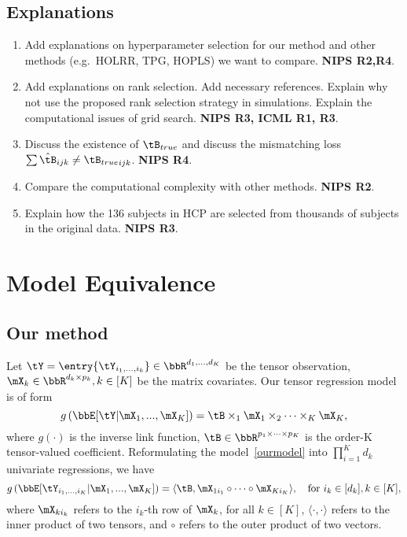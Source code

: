\documentclass[11pt]{article}
\newcommand{\of}[1]{\left(#1\right)}
\theoremstyle{plain}
\theoremstyle{definition}
\begin{document}
\subsection{Explanations}
\begin{enumerate}
	\item Add explanations on hyperparameter selection for our method and other methods (e.g.\ HOLRR, TPG, HOPLS) we want to compare. {\bf NIPS R2,R4}.
	\item Add explanations on rank selection. Add necessary references. Explain why not use the proposed rank selection strategy in simulations. Explain the computational issues of grid search. {\bf NIPS R3, ICML R1, R3}.
	\item Discuss the existence of $\tB_{true}$ and discuss the mismatching loss $\sum \hat \tB_{ijk} \neq {\tB_{true}}_{ijk}$. {\bf NIPS R4}.
	\item Compare the computational complexity with other methods. {\bf NIPS R2}.
	\item Explain how the 136 subjects in HCP are selected from thousands of subjects in the original data. {\bf NIPS R3}.
\end{enumerate}


\section{Model Equivalence}

\subsection{Our method}
Let $\tY = \entry{\tY_{i_1,...,i_k}} \in \bbR^{d_1,...,d_K}$ be the tensor observation, $\mX_k \in \bbR^{d_k \times p_k}, k \in [K]$ be the matrix covariates. Our tensor regression model is of form
\begin{equation}\label{ourmodel}
	g \of{ \bbE[\tY |\mX_1 ,...,\mX_K ] } = \tB \times_1 \mX_1 \times_2 \cdots \times_K \mX_K,
\end{equation}
where $g(\cdot)$ is the inverse link function, $\tB \in \bbR^{p_1 \times \cdots \times p_K}$ is the order-K tensor-valued coefficient. Reformulating the model~\eqref{ourmodel} into $\prod_{i=1}^K d_k$ univariate regressions, we have
\begin{equation}\label{ourmodel1}
	g \of{ \bbE[\tY_{i_1,...,i_K} |\mX_1 ,...,\mX_K ] }  = \langle \tB, \mX_{1i_1} \circ \cdots \circ \mX_{K i_K}  \rangle, \quad \text{for } i_k \in [d_k], k\in[K],
\end{equation}
where $\mX_{k i_k}$ refers to the $i_k$-th row of $\mX_k$, for all $k \in [K]$, $\langle \cdot, \cdot \rangle$ refers to the inner product of two tensors, and $\circ$ refers to the outer product of two vectors.
\end{document}
